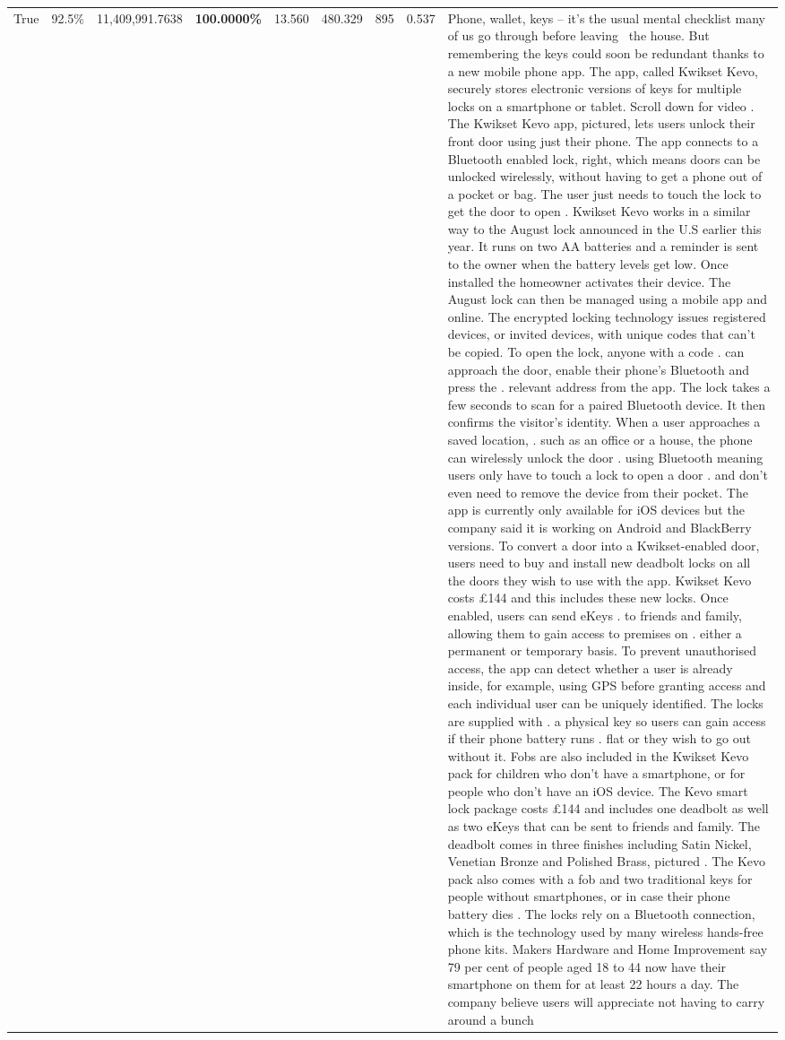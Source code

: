 \begin{table}[H]
\begin{tabular}{lllrlllll}
True & 92.5\% & 11,409,991.7638 & \bfseries \color{red} 100.0000\% & 13.560 & 480.329 & 895 & 0.537 & Phone, wallet, keys – it’s the usual mental checklist many of us go through before leaving  the house. But remembering the keys could soon be redundant thanks to a new mobile phone app. The app, called Kwikset Kevo, securely stores electronic versions of keys for multiple locks on a smartphone or tablet. Scroll down for video . The Kwikset Kevo app, pictured, lets users unlock their front door using just their phone. The app connects to a Bluetooth enabled lock, right, which means doors can be unlocked wirelessly, without having to get a phone out of a pocket or bag. The user just needs to touch the lock to get the door to open . Kwikset Kevo works in a similar way to the August lock announced in the U.S earlier this year. It runs on two AA batteries and a reminder is sent to the owner when the battery levels get low. Once installed the homeowner activates their device. The August lock can then be managed using a mobile app and online. The encrypted locking technology issues registered devices, or invited devices, with unique codes that can't be copied. To open the lock, anyone with a code . can approach the door, enable their phone's Bluetooth and press the . relevant address from the app. The lock takes a few seconds to scan for a paired Bluetooth device. It then confirms the visitor's identity. When a user approaches a saved location, . such as an office or a house, the phone can wirelessly unlock the door . using Bluetooth meaning users only have to touch a lock to open a door . and don't even need to remove the device from their pocket. The app is currently only available for iOS devices but the company said it is working on Android and BlackBerry versions. To convert a door into a Kwikset-enabled door, users need to buy and install new deadbolt locks on all the doors they wish to use with the app. Kwikset Kevo costs £144 and this includes these new locks. Once enabled, users can send eKeys . to friends and family, allowing them to gain access to premises on . either a permanent or temporary basis. To prevent unauthorised access, the app can detect whether a user is already inside, for example, using GPS before granting access and each individual user can be uniquely identified. The locks are supplied with . a physical key so users can gain access if their phone battery runs . flat or they wish to go out without it. Fobs are also included in the Kwikset Kevo pack for children who don't have a smartphone, or for people who don't have an iOS device. The Kevo smart lock package costs £144 and includes one deadbolt as well as two eKeys that can be sent to friends and family. The deadbolt comes in three finishes including Satin Nickel, Venetian Bronze and Polished Brass, pictured . The Kevo pack also comes with a fob and two traditional keys for people without smartphones, or in case their phone battery dies . The locks rely on a Bluetooth connection, which is the technology used by many wireless hands-free phone kits. Makers Hardware and Home Improvement say 79 per cent of people aged 18 to 44 now have their smartphone on them for at least 22 hours a day. The company believe users will appreciate not having to carry around a bunch 
\end{tabular}
\end{table}
